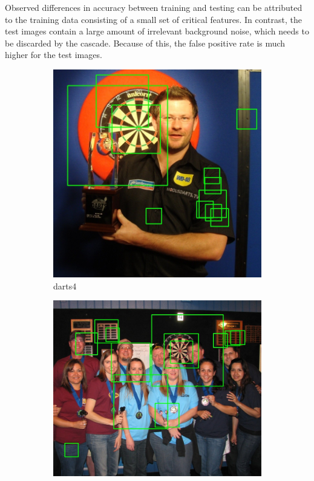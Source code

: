 \documentclass[conference]{IEEEtran}
\begin{document}
\par
Observed differences in accuracy between training and testing can be attributed to the training data consisting of a small set of critical features. In contrast, the test images contain a large amount of irrelevant background noise, which needs to be discarded by the cascade. Because of this, the false positive rate is much higher for the test images. 
\par
\begin{figure}[htb]
\centering
\begin{subfigure}{.5\linewidth}
  \centering
  \includegraphics[width=.9\linewidth]{images/task2/detected4.jpg}
  \caption{darts4}
  \label{fig:sub1}
\end{subfigure}%
\begin{subfigure}{.5\linewidth}
  \centering
  \vspace{0.7cm}
  \includegraphics[width=.9\linewidth]{images/task2/detected5.jpg}

\end{subfigure}
\end{figure}
\end{document}
